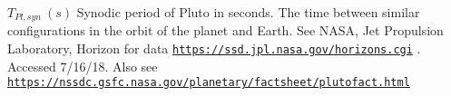 $ T_{Pl,syn} \ (s)$ Synodic period of Pluto in seconds. The time between similar configurations in the orbit of the planet and Earth. See N\+A\+SA, Jet Propulsion Laboratory, Horizon for data \href{https://ssd.jpl.nasa.gov/horizons.cgi}{\tt https\+://ssd.\+jpl.\+nasa.\+gov/horizons.\+cgi} . Accessed 7/16/18. Also see \href{https://nssdc.gsfc.nasa.gov/planetary/factsheet/plutofact.html}{\tt https\+://nssdc.\+gsfc.\+nasa.\+gov/planetary/factsheet/plutofact.\+html} 
